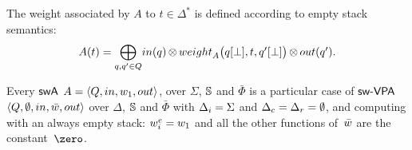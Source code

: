 %

\noindent
The weight associated by $A$ to $t \in \Delta^*$
is defined according to empty stack semantics:
%
\begin{equation}
A(t)  =
{\displaystyle\bigoplus_{q, q' \in Q}} \textstyle
\mathsf{in}(q) \mathop{\otimes}
\weight_A\bigl(\config{q}{\bot}, t, \config{q'}{\bot}\bigr)
\mathop{\otimes} \mathsf{out}(q').
\label{eq:SWVPA-value}
\end{equation}

\noindent
Every $\textsf{swA}$ $A = \< Q, \init, {\wei_1}, \final >$,
over $\Sigma$, $\mathbb{S}$ and $\bar\Phi$
is a particular case of $\textsf{sw-VPA}$
$\< Q, \emptyset, \init, \bar\wei, \final >$
over $\Delta$, $\mathbb{S}$ and $\bar\Phi$
with $\Deltai = \Sigma$ and $\Deltac = \Deltar = \emptyset$,
and computing with an always empty stack:
$\weiei = \wei_1$ and all the other functions
of~$\bar\wei$ are the constant~$\zero$.


